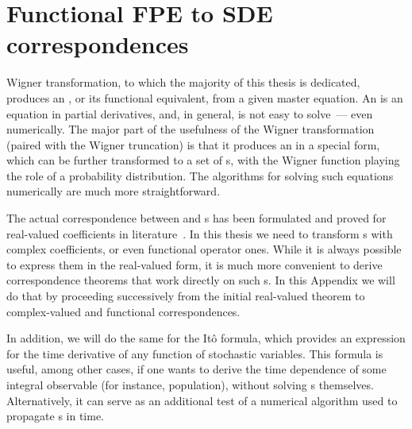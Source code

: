 \chapter{Functional FPE to SDE correspondences}
\label{cha:appendix:fpe-sde}

Wigner transformation, to which the majority of this thesis is dedicated, produces an , or its functional equivalent, from a given master equation.
An  is an equation in partial derivatives, and, in general, is not easy to solve~--- even numerically.
The major part of the usefulness of the Wigner transformation (paired with the Wigner truncation) is that it produces an  in a special form, which can be further transformed to a set of s, with the Wigner function playing the role of a probability distribution.
The algorithms for solving such equations numerically are much more straightforward.

The actual correspondence between  and s has been formulated and proved for real-valued coefficients in literature~\cite{Risken1996}.
In this thesis we need to transform s with complex coefficients, or even functional operator ones.
While it is always possible to express them in the real-valued form, it is much more convenient to derive correspondence theorems that work directly on such s.
In this Appendix we will do that by proceeding successively from the initial real-valued theorem to complex-valued and functional correspondences.

In addition, we will do the same for the It\^o formula, which provides an expression for the time derivative of any function of stochastic variables.
This formula is useful, among other cases, if one wants to derive the time dependence of some integral observable (for instance, population), without solving s themselves.
Alternatively, it can serve as an additional test of a numerical algorithm used to propagate s in time.



